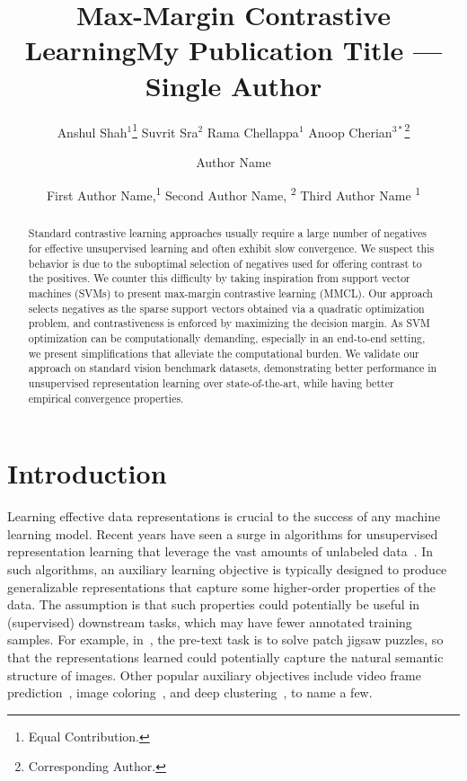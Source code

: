 \documentclass[letterpaper]{article} \usepackage{aaai22}  \usepackage{times}  \usepackage{helvet}  \usepackage{courier}  \usepackage[hyphens]{url}  \usepackage{graphicx} \urlstyle{rm} \def\UrlFont{\rm}  \usepackage{natbib}  \usepackage{caption} \DeclareCaptionStyle{ruled}{labelfont=normalfont,labelsep=colon,strut=off} \frenchspacing  \setlength{\pdfpagewidth}{8.5in}  \setlength{\pdfpageheight}{11in}
\title{Max-Margin Contrastive Learning}
\author{Anshul Shah$^1$\thanks{Equal Contribution.} \qquad Suvrit Sra$^2$ \qquad Rama Chellappa$^1$ \qquad  Anoop Cherian$^{3*}$\thanks{Corresponding Author.}\\
}
\title{My Publication Title --- Single Author}
\author {
    Author Name
}
\author {
First Author Name,\textsuperscript{\rm 1}
    Second Author Name, \textsuperscript{\rm 2}
    Third Author Name \textsuperscript{\rm 1}
}
\begin{document}
\maketitle

\begin{abstract}
Standard contrastive learning approaches usually require a large number of negatives for effective unsupervised learning and often exhibit slow convergence. We suspect this behavior is due to the suboptimal selection of negatives used for offering contrast to the positives. We counter this difficulty by taking inspiration from support vector machines (SVMs) to present max-margin contrastive learning (MMCL). Our approach selects negatives as the sparse support vectors obtained via a quadratic optimization problem, and contrastiveness is enforced by maximizing the decision margin. As SVM optimization can be computationally demanding, especially in an end-to-end setting, we present simplifications that alleviate the computational burden. We validate our approach on standard vision benchmark datasets, demonstrating better performance in unsupervised representation learning over state-of-the-art, while having better empirical convergence properties. 
\end{abstract}

\section{Introduction}
Learning effective data representations is crucial to the success of any machine learning model. Recent years have seen a surge in algorithms for unsupervised representation learning that leverage the vast amounts of unlabeled data~\cite{chen2020simple,gidaris2018unsupervised,lee2017unsupervised,zhang2019aet,zhan2020online}.  In such algorithms, an auxiliary learning objective is typically designed to produce generalizable representations that capture some higher-order properties of the data. The assumption is that such properties could potentially be useful in (supervised) downstream tasks, which may have fewer annotated training samples. For example, in~\cite{noroozi2016unsupervised,santa2018visual}, the pre-text task is to solve patch jigsaw puzzles, so that the representations learned could potentially capture the natural semantic structure of images. Other popular auxiliary objectives include video frame prediction~\cite{oord2018representation}, image coloring~\cite{zhang2016colorful}, and deep clustering~\cite{caron2018deep}, to name a few.
\end{document}
